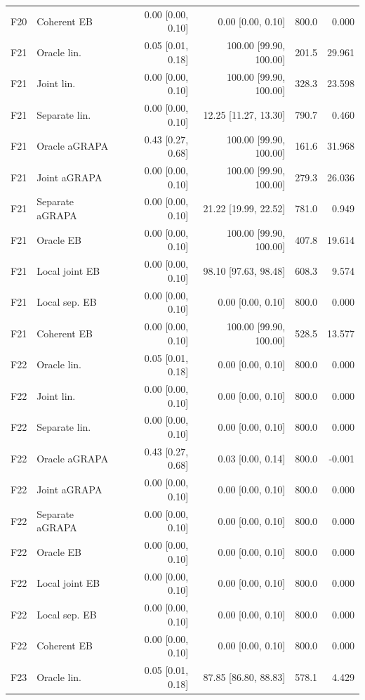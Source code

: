 \begin{longtable}{llrrrr}
F20 & Coherent EB & 0.00 [0.00, 0.10] & 0.00 [0.00, 0.10] & 800.0 & 0.000\\
F21 & Oracle lin. & 0.05 [0.01, 0.18] & 100.00 [99.90, 100.00] & 201.5 & 29.961\\
F21 & Joint lin. & 0.00 [0.00, 0.10] & 100.00 [99.90, 100.00] & 328.3 & 23.598\\
F21 & Separate lin. & 0.00 [0.00, 0.10] & 12.25 [11.27, 13.30] & 790.7 & 0.460\\
F21 & Oracle aGRAPA & 0.43 [0.27, 0.68] & 100.00 [99.90, 100.00] & 161.6 & 31.968\\
F21 & Joint aGRAPA & 0.00 [0.00, 0.10] & 100.00 [99.90, 100.00] & 279.3 & 26.036\\
F21 & Separate aGRAPA & 0.00 [0.00, 0.10] & 21.22 [19.99, 22.52] & 781.0 & 0.949\\
F21 & Oracle EB & 0.00 [0.00, 0.10] & 100.00 [99.90, 100.00] & 407.8 & 19.614\\
F21 & Local joint EB & 0.00 [0.00, 0.10] & 98.10 [97.63, 98.48] & 608.3 & 9.574\\
F21 & Local sep. EB & 0.00 [0.00, 0.10] & 0.00 [0.00, 0.10] & 800.0 & 0.000\\
F21 & Coherent EB & 0.00 [0.00, 0.10] & 100.00 [99.90, 100.00] & 528.5 & 13.577\\
F22 & Oracle lin. & 0.05 [0.01, 0.18] & 0.00 [0.00, 0.10] & 800.0 & 0.000\\
F22 & Joint lin. & 0.00 [0.00, 0.10] & 0.00 [0.00, 0.10] & 800.0 & 0.000\\
F22 & Separate lin. & 0.00 [0.00, 0.10] & 0.00 [0.00, 0.10] & 800.0 & 0.000\\
F22 & Oracle aGRAPA & 0.43 [0.27, 0.68] & 0.03 [0.00, 0.14] & 800.0 & -0.001\\
F22 & Joint aGRAPA & 0.00 [0.00, 0.10] & 0.00 [0.00, 0.10] & 800.0 & 0.000\\
F22 & Separate aGRAPA & 0.00 [0.00, 0.10] & 0.00 [0.00, 0.10] & 800.0 & 0.000\\
F22 & Oracle EB & 0.00 [0.00, 0.10] & 0.00 [0.00, 0.10] & 800.0 & 0.000\\
F22 & Local joint EB & 0.00 [0.00, 0.10] & 0.00 [0.00, 0.10] & 800.0 & 0.000\\
F22 & Local sep. EB & 0.00 [0.00, 0.10] & 0.00 [0.00, 0.10] & 800.0 & 0.000\\
F22 & Coherent EB & 0.00 [0.00, 0.10] & 0.00 [0.00, 0.10] & 800.0 & 0.000\\
F23 & Oracle lin. & 0.05 [0.01, 0.18] & 87.85 [86.80, 88.83] & 578.1 & 4.429\\

\end{longtable}
